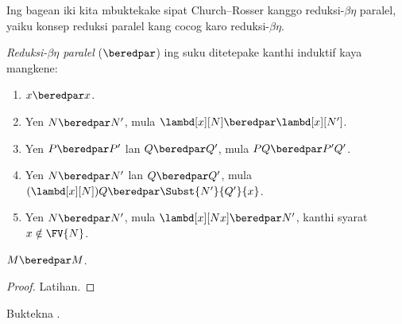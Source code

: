 \documentclass[../../../include/open-logic-section]{subfiles}
\begin{document}


Ing bagean iki kita mbuktekake
sipat Church--Rosser kanggo
reduksi-$\beta\eta$ paralel,
yaiku konsep reduksi paralel
kang cocog karo
reduksi-$\beta\eta$.

\begin{defn} 
  \emph{Reduksi-$\beta\eta$ paralel}
  ($\beredpar$) ing suku
  ditetepake kanthi induktif
  kaya mangkene:
  \begin{enumerate}
    \item {} $x \beredpar x$.
    \item {} Yen $N \beredpar N'$, mula $\lambd[x][N] \beredpar
      \lambd[x][N']$.
    \item {} Yen $P \beredpar P'$ lan $Q \beredpar Q'$, mula $PQ \beredpar
      P'Q'$.
    \item {} Yen $N \beredpar N'$ lan $Q \beredpar Q'$, mula
      $(\lambd[x][N])Q \beredpar \Subst{N'}{Q'}{x}$.
    \item {} Yen $N \beredpar N'$, mula $\lambd[x][Nx]
      \beredpar N'$, kanthi syarat $x \notin \FV{N}$.
  \end{enumerate}
\end{defn}

\begin{thm}
  $M \beredpar M$.
\end{thm}

\begin{proof}
  Latihan.
\end{proof}

\begin{prob}
  Buktekna .
\end{prob}
\end{document}
